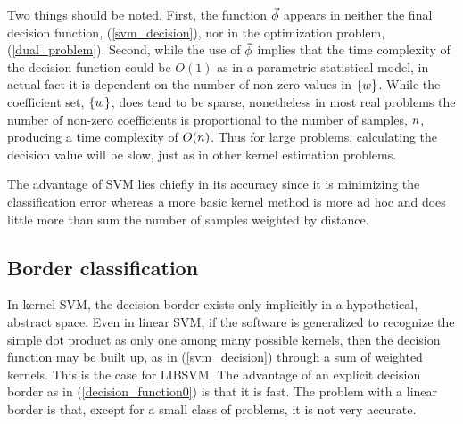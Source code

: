 \documentclass[11pt]{article}
\begin{document}
Two things should be noted. First, the function $\vec\phi$ appears in
neither the final decision function, (\ref{svm_decision}), nor in the
optimization problem, (\ref{dual_problem}). Second, while the use of
$\vec\phi$ implies that the time complexity of the decision function 
could be $O(1)$ as in a parametric statistical model, in actual fact it is
dependent on the number of non-zero values in $\lbrace w \rbrace$.
While the coefficient set, $\lbrace w \rbrace$, does tend to be sparse,
nonetheless in most real problems the number of non-zero coefficients is
proportional to the number of samples, $n$, producing a time complexity
of $O(n)$. Thus for large problems, calculating the decision value will
be slow, just as in other kernel estimation problems.

The advantage of SVM lies chiefly in its accuracy since it is minimizing the
classification error whereas a more basic kernel method is more ad hoc
and does little more than sum the number of samples weighted by distance.

\subsection{Border classification}

\label{border_method}

In kernel SVM, the decision border exists only implicitly in a hypothetical,
abstract space. Even in linear SVM, if the software is generalized to 
recognize the simple dot product as only one among many possible kernels,
then the decision function may be built up, as in (\ref{svm_decision})
through a sum of weighted kernels. This is the case for LIBSVM.
The advantage of an explicit decision border as in (\ref{decision_function0})
is that it is fast. The problem with a linear border is that, except for a
small class of problems, it is not very accurate.
\end{document}

